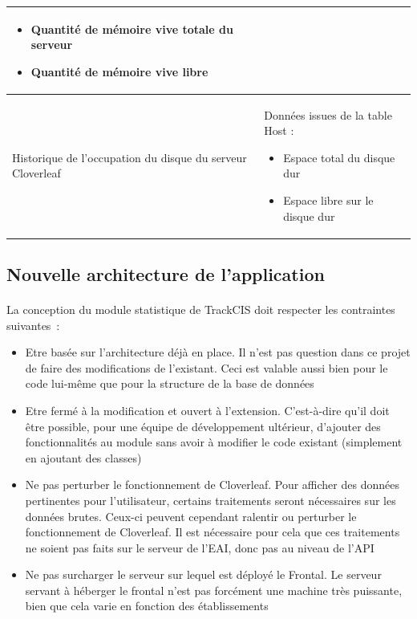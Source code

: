 \begin{table}[H]
\begin{tabular}{| p{5cm} | p{8cm} |}
\begin{itemize}
						  \item Quantité de mémoire vive totale du serveur
						  \item Quantité de mémoire vive libre
						\end{itemize}
						\\
					\hline
						Historique de l'occupation du disque du serveur Cloverleaf
						&
						Données issues de la table Host :
						\begin{itemize}
						  \item Espace total du disque dur
						  \item Espace libre sur le disque dur
						\end{itemize}
						\\
					\hline
				\end{tabular}
			\end{table}
		
		\subsection{Nouvelle architecture de l'application}
			\paragraph{}%
			La conception du module statistique de TrackCIS doit respecter les
			contraintes suivantes~:
			\begin{itemize}%
			  \item Etre basée sur l'architecture déjà en place. Il n'est pas question
			  dans ce projet de faire des modifications de l'existant. Ceci est
			  valable aussi bien pour le code lui-même que pour la structure de la base
			  de données
			  \item Etre fermé à la modification et ouvert à l'extension. C'est-à-dire
			  qu'il doit être possible, pour une équipe de développement ultérieur,
			  d'ajouter des fonctionnalités au module sans avoir à modifier le code
			  existant (simplement en ajoutant des classes)
			  \item Ne pas perturber le fonctionnement de Cloverleaf. Pour afficher des
			  données pertinentes pour l'utilisateur, certains traitements seront
			  nécessaires sur les données brutes. Ceux-ci peuvent cependant ralentir ou
			  perturber le fonctionnement de Cloverleaf. Il est nécessaire pour cela que
			  ces traitements ne soient pas faits sur le serveur de l'EAI, donc pas au
			  niveau de l'API
			  \item Ne pas surcharger le serveur sur lequel est déployé le Frontal. Le
			  serveur servant à héberger le frontal n'est pas forcément une machine très
			  puissante, bien que cela varie en fonction des établissements
			\end{itemize}
			
